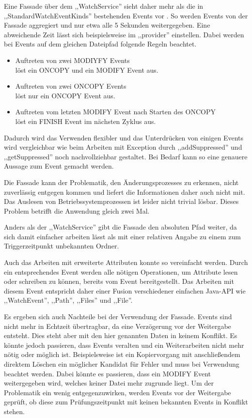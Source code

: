 \documentclass[oneside, ngerman, toc=bibliography,bibliography=totoc,listof=entryprefix, open=right,numbers=noenddot,fontsize=12pt]{scrbook}
\begin{document}
Eine Fassade  über dem ,,WatchService'' sieht daher mehr als die in  ,,StandardWatchEventKinds'' bestehenden Events vor \cite{gamma2011entwurfsmuster}. So werden Events von der Fassade aggregiert und nur etwa alle 5 Sekunden weitergegeben. Eine abweichende Zeit lässt sich beispielsweise im ,,provider'' einstellen. Dabei werden bei Events auf dem gleichen Dateipfad folgende Regeln beachtet.

\begin{itemize}
    \item Auftreten von zwei MODIYFY Events \\
    löst ein ONCOPY und ein MODIFY Event aus.
    \item Auftreten von zwei ONCOPY Events\\
    löst nur ein ONCOPY Event aus.
    \item Auftreten vom letzten MODIFY Event nach Starten des ONCOPY\\
    löst ein FINISH Event im nächsten Zyklus aus.
\end{itemize}

Dadurch wird das Verwenden flexibler und das Unterdrücken von einigen Events wird vergleichbar wie beim Arbeiten mit Exception durch ,,addSuppressed'' und ,,getSuppressed'' noch nachvollziehbar gestaltet. Bei Bedarf kann so eine genauere Aussage zum Event gemacht werden.

Die Fassade kann der Problematik, den Änderungsprozesses zu erkennen, nicht zuverlässig entgegen kommen und liefert die Informationen daher auch nicht mit. Das Auslesen von Betriebssystemprozessen ist leider nicht trivial lösbar. Dieses Problem betrifft die Anwendung gleich zwei Mal.

Anders als der ,,WatchService'' gibt die Fassade den absoluten Pfad weiter, da sich damit einfacher arbeiten lässt als mit einer relativen Angabe zu einem zum Triggerzeitpunkt unbekannten Ordner.

Auch das Arbeiten mit erweiterte Attributen konnte so vereinfacht werden.
Durch ein entsprechendes Event werden alle nötigen Operationen, um Attribute lesen oder schreiben zu können, bereits vom Event bereitgestellt. Das Arbeiten mit diesem Event entspricht daher einer Fusion verschiedener einfachen Java-API wie ,,WatchEvent'', ,,Path'', ,,Files'' und ,,File''.

Es ergeben sich auch Nachteile bei der Verwendung  der Fassade. Events sind nicht mehr in Echtzeit übertragbar, da eine Verzögerung vor der Weitergabe entsteht. Dies steht aber mit den hier genannten Daten in keinem Konflikt. Es könnte jedoch passieren, dass Events veralten und ein Weiterarbeiten nicht mehr nötig oder möglich ist. Beispielsweise ist ein Kopiervorgang mit anschließendem direktem Löschen ein möglicher Kandidat für Fehler und muss bei Verwendung beachtet werden. Dabei könnte es passieren, dass ein MODIFY Event weitergegeben wird, welches keiner Datei mehr zugrunde liegt.
Um der Problematik ein wenig entgegenzuwirken, werden Events vor der Weitergabe geprüft, ob diese zum Prüfungszeitpunkt mit keinen bekannten Events in Konflikt stehen.
\end{document}
